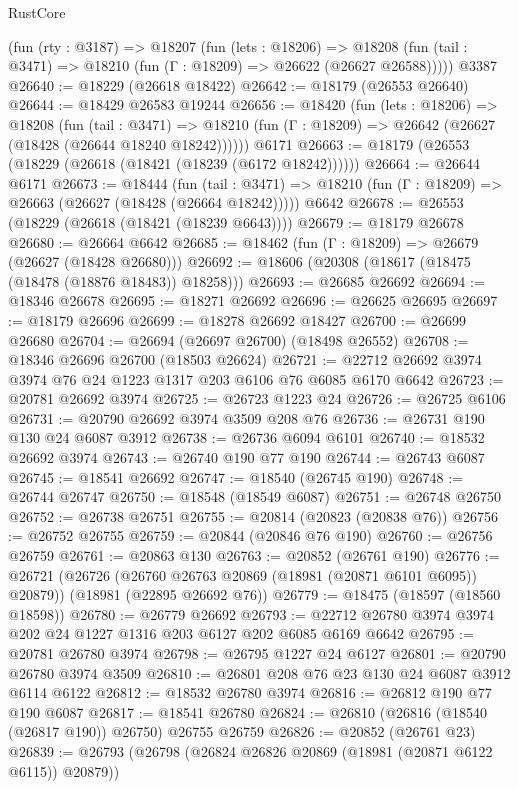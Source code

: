 \begin{lexlean}{RustCore}
\begin{coremodule}
    (fun (rty : @3187) =>
    @18207
      (fun (lets : @18206) =>
      @18208 (fun (tail : @3471) => @18210 (fun (Γ : @18209) => @26622 (@26627 @26588)))))
    @3387
@26640 := @18229 (@26618 @18422)
@26642 := @18179 (@26553 @26640)
@26644 := @18429 @26583 @19244
@26656 := @18420
    (fun (lets : @18206) =>
    @18208
      (fun (tail : @3471) =>
      @18210 (fun (Γ : @18209) => @26642 (@26627 (@18428 (@26644 @18240 @18242))))))
    @6171
@26663 := @18179 (@26553 (@18229 (@26618 (@18421 (@18239 (@6172 @18242))))))
@26664 := @26644 @6171
@26673 := @18444
    (fun (tail : @3471) => @18210 (fun (Γ : @18209) => @26663 (@26627 (@18428 (@26664 @18242)))))
    @6642
@26678 := @26553 (@18229 (@26618 (@18421 (@18239 @6643))))
@26679 := @18179 @26678
@26680 := @26664 @6642
@26685 := @18462 (fun (Γ : @18209) => @26679 (@26627 (@18428 @26680)))
@26692 := @18606 (@20308 (@18617 (@18475 (@18478 (@18876 @18483)) @18258)))
@26693 := @26685 @26692
@26694 := @18346 @26678
@26695 := @18271 @26692
@26696 := @26625 @26695
@26697 := @18179 @26696
@26699 := @18278 @26692 @18427
@26700 := @26699 @26680
@26704 := @26694 (@26697 @26700) (@18498 @26552)
@26708 := @18346 @26696 @26700 (@18503 @26624)
@26721 := @22712 @26692 @3974 @3974 @76 @24 @1223 @1317 @203 @6106 @76 @6085 @6170 @6642
@26723 := @20781 @26692 @3974
@26725 := @26723 @1223 @24
@26726 := @26725 @6106
@26731 := @20790 @26692 @3974 @3509 @208 @76
@26736 := @26731 @190 @130 @24 @6087 @3912
@26738 := @26736 @6094 @6101
@26740 := @18532 @26692 @3974
@26743 := @26740 @190 @77 @190
@26744 := @26743 @6087
@26745 := @18541 @26692
@26747 := @18540 (@26745 @190)
@26748 := @26744 @26747
@26750 := @18548 (@18549 @6087)
@26751 := @26748 @26750
@26752 := @26738 @26751
@26755 := @20814 (@20823 (@20838 @76))
@26756 := @26752 @26755
@26759 := @20844 (@20846 @76 @190)
@26760 := @26756 @26759
@26761 := @20863 @130
@26763 := @20852 (@26761 @190)
@26776 := @26721
    (@26726 (@26760 @26763 @20869 (@18981 (@20871 @6101 @6095)) @20879))
    (@18981 (@22895 @26692 @76))
@26779 := @18475 (@18597 (@18560 @18598))
@26780 := @26779 @26692
@26793 := @22712 @26780 @3974 @3974 @202 @24 @1227 @1316 @203 @6127 @202 @6085 @6169 @6642
@26795 := @20781 @26780 @3974
@26798 := @26795 @1227 @24 @6127
@26801 := @20790 @26780 @3974 @3509
@26810 := @26801 @208 @76 @23 @130 @24 @6087 @3912 @6114 @6122
@26812 := @18532 @26780 @3974
@26816 := @26812 @190 @77 @190 @6087
@26817 := @18541 @26780
@26824 := @26810 (@26816 (@18540 (@26817 @190)) @26750) @26755 @26759
@26826 := @20852 (@26761 @23)
@26839 := @26793
    (@26798 (@26824 @26826 @20869 (@18981 (@20871 @6122 @6115)) @20879))

\end{coremodule}
\end{lexlean}
